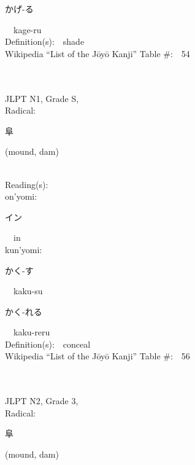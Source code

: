 \begin{multicols}{2}
{\hspace*{2em}}{\begin{CJK}{UTF8}{min} かげ-る \end{CJK}}\ \ kage-ru\ \ \\
Definition(s):\ \ shade \\
Wikipedia ``List of the J\=oy\=o Kanji'' Table \#:\ \ 54 \\
\ \ \\
{\fontsize{34pt}{40pt}  }\ \ \\
{JLPT N1, Grade S, \\Radical:\ \ {\begin{CJK}{UTF8}{min} 阜 \end{CJK}} (mound, dam) } \\
Reading(s):\ \ \\
{\hspace*{1em}}on'yomi:\ \ \\
{\hspace*{2em}}{\begin{CJK}{UTF8}{min} イン \end{CJK}}\ \ in\ \ \\
{\hspace*{1em}}kun'yomi:\ \ \\
{\hspace*{2em}}{\begin{CJK}{UTF8}{min} かく-す \end{CJK}}\ \ kaku-su\ \ \\
{\hspace*{2em}}{\begin{CJK}{UTF8}{min} かく-れる \end{CJK}}\ \ kaku-reru\ \ \\
Definition(s):\ \ conceal \\
Wikipedia ``List of the J\=oy\=o Kanji'' Table \#:\ \ 56 \\
\ \ \\
{\fontsize{34pt}{40pt}  }\ \ \\  %
{JLPT N2, Grade 3, \\Radical:\ \ {\begin{CJK}{UTF8}{min} 阜 \end{CJK}} (mound, dam) } \\

\end{multicols}
